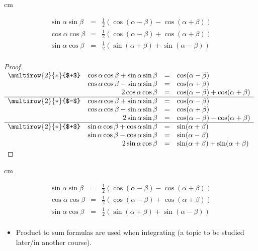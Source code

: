 \begin{frame}
 cm
\begin{proposition}
\[
\begin{array}{rcl}
\sin \alpha \sin \beta &=&\displaystyle \frac{1}{2}\left(\cos( \alpha -\beta) -\cos(\alpha+\beta) \right)\\
\cos \alpha \cos \beta &=&\displaystyle \frac{1}{2}\left( \cos( \alpha -\beta) +\cos(\alpha+\beta) \right)\\
\sin \alpha \cos \beta &=&\displaystyle \frac{1}{2}\left(\sin( \alpha +\beta) +\sin(\alpha-\beta) \right)\\
\end{array}
\]
\end{proposition}
\begin{proof}
$
\begin{array}{lrcl}
\multirow{2}{*}{$+$}&\cos\alpha\cos\beta+\sin\alpha\sin\beta &=&\cos(\alpha-\beta)\\
&\cos\alpha\cos\beta-\sin\alpha\sin\beta &=&\cos(\alpha+\beta)\\
&2\cos\alpha \cos \beta &=&\cos(\alpha-\beta)+\cos(\alpha+\beta)\\\hline 
\multirow{2}{*}{$-$}&\cos\alpha\cos\beta+\sin\alpha\sin\beta &=&\cos(\alpha-\beta)\\
&\cos\alpha\cos\beta-\sin\alpha\sin\beta &=&\cos(\alpha+\beta)\\
&2\sin\alpha \sin \beta &=&\cos(\alpha-\beta)-\cos(\alpha+\beta)\\\hline 
\multirow{2}{*}{$+$}&\sin\alpha\cos\beta+\cos\alpha\sin\beta &=&\sin(\alpha+\beta)\\
&\sin\alpha\cos\beta-\cos\alpha\sin\beta &=&\sin(\alpha-\beta)\\
&2\sin\alpha \cos \beta &=&\sin(\alpha+\beta)+\sin(\alpha+\beta)\\
\end{array}
$
\end{proof}

\end{frame}
\begin{frame}
 cm
\begin{proposition}
\[
\begin{array}{rcl}
\sin \alpha \sin \beta &=&\displaystyle \frac{1}{2}\left(\cos( \alpha -\beta) -\cos(\alpha+\beta) \right)\\
\cos \alpha \cos \beta &=&\displaystyle \frac{1}{2}\left( \cos( \alpha -\beta) +\cos(\alpha+\beta) \right)\\
\sin \alpha \cos \beta &=&\displaystyle \frac{1}{2}\left(\sin( \alpha +\beta) +\sin(\alpha-\beta) \right)\\
\end{array}
\]
\end{proposition}
\begin{itemize}
\item Product to sum formulas are used when integrating (a topic to be studied later/in another course).
\end{itemize}
\vskip 10cm

\end{frame}